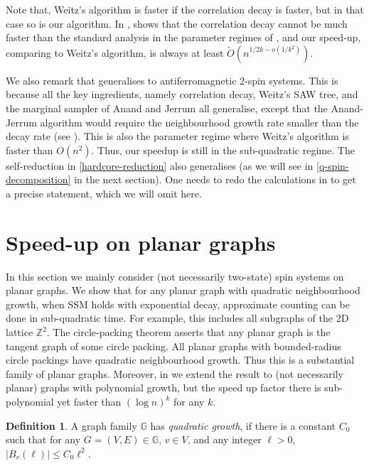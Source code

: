 \documentclass[11pt,a4paper]{amsart}
\def\=#1{\mathbb{#1}}
\newcommand{\abs}[1]{\ensuremath{\left\vert#1\right\vert}}
\theoremstyle{definition}
\newtheorem{definition}[theorem]{Definition}
\theoremstyle{remark}
\begin{document}
Note that, Weitz's algorithm is faster if the correlation decay is faster,
but in that case so is our algorithm.
In ,
 shows that the correlation decay cannot be much faster than the standard analysis in the parameter regimes of ,
and our speed-up, comparing to Weitz's algorithm, is always at least $\widetilde{O}(n^{1/2k-o(1/k^2)})$.

We also remark that  generalises to antiferromagnetic 2-spin systems.
This is because all the key ingredients, namely correlation decay, Weitz's SAW tree, and the marginal sampler of Anand and Jerrum all generalise,
except that the Anand-Jerrum algorithm would require the neighbourhood growth rate smaller than the decay rate (see ).
This is also the parameter regime where Weitz's algorithm is faster than $O(n^2)$.
Thus, our speedup is still in the sub-quadratic regime.
The self-reduction in \eqref{hardcore-reduction} also generalises (as we will see in \eqref{q-spin-decomposition} in the next section).
One needs to redo the calculations in  to get a precise statement, which we will omit here.

\section{Speed-up on planar graphs}
In this section we mainly consider (not necessarily two-state) spin systems on planar graphs.
We show that for any planar graph with quadratic neighbourhood growth,
when SSM holds with exponential decay,
approximate counting can be done in sub-quadratic time.
For example, this includes all subgraphs of the 2D lattice $\=Z^2$.
The circle-packing theorem asserts that any planar graph is the tangent graph of some circle packing.
All planar graphs with bounded-radius circle packings have quadratic neighbourhood growth.
Thus this is a substantial family of planar graphs.
Moreover, in  we extend the result to (not necessarily planar) graphs with polynomial growth,
but the speed up factor there is sub-polynomial yet faster than $(\log n)^k$ for any $k$.

\begin{definition}  \label{def:quadratic-growth}
  A graph family $\=G$ has \emph{quadratic growth},
  if there is a constant $C_0$ such that for any $G=(V,E)\in\=G$, $v\in V$, and any integer $\ell>0$,
  $\abs{B_v(\ell)}\le C_0\ell^2$.
\end{definition}
\end{document}

